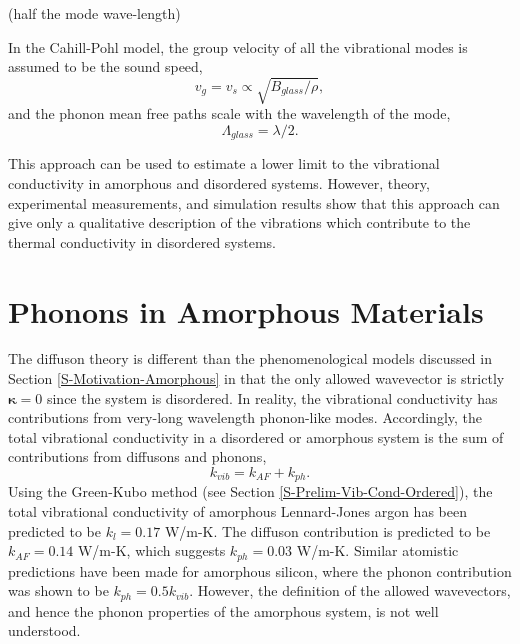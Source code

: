 \documentclass[aps,prb,preprint,superscriptaddress,amsmath,amssymb,floatfix]{revtex4}
\begin{document}
(half the mode 
wave-length)

In the Cahill-Pohl model,
\cite{PhysRevB.46.6131} the group velocity of all the vibrational modes is 
assumed to be the sound speed,
\begin{equation}\label{E-Seq}
v_g = v_s \propto \sqrt{B_{glass}/\rho},
\end{equation}
and the phonon mean free paths scale with the wavelength of the mode,
\begin{equation}\label{EQ:M:l_glass}
\Lambda_{glass} = \lambda /2.
\end{equation}

This approach can be used to estimate a lower limit to the vibrational 
conductivity in amorphous and disordered systems.
\cite{cahill_lower_1992,cahill_thermal_1987} 
However, theory,\cite{allen_thermal_1993} experimental measurements,
\cite{graebner_phonon_1986} and simulation results
\cite{shenogin_predicting_2009} show that this approach can give only a 
qualitative description of the vibrations which contribute to the thermal 
conductivity in disordered systems.



\section{\label{S-Prelim-Phonons-Amor}Phonons in Amorphous Materials }
The diffuson theory is different than the phenomenological models 
discussed in Section \ref{S-Motivation-Amorphous} in that the only 
allowed wavevector is strictly $\mathbf{\kappa}= 0$ since the system is 
disordered. In reality, the vibrational conductivity has contributions 
from very-long wavelength phonon-like modes. Accordingly, the total 
vibrational conductivity in a disordered or amorphous system is the sum of 
contributions from diffusons and phonons,
\begin{equation}\label{EQ:M:k_thermal}
k_{vib} = k_{AF} + k_{ph}.
\end{equation}
Using the Green-Kubo method (see Section \ref{S-Prelim-Vib-Cond-Ordered}), 
the total vibrational conductivity of amorphous Lennard-Jones argon has 
been predicted to be $k_{l}=0.17$ W/m-K. The diffuson contribution is 
predicted to be $k_{AF} = 0.14$ W/m-K, which suggests 
$k_{ph} = 0.03$ W/m-K. Similar atomistic predictions have been made for 
amorphous silicon, where the phonon contribution was shown to be 
$k_{ph} = 0.5k_{vib}$.\cite{He2011a} However, the definition of the 
allowed wavevectors, and hence the phonon properties of the amorphous 
system, is not well understood.\cite{He2011a}
\end{document}
